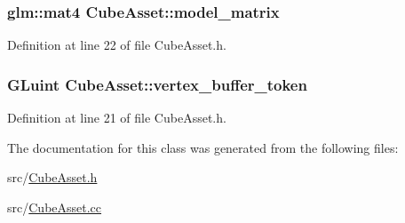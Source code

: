 \subsubsection[{model\+\_\+matrix}]{\setlength{\rightskip}{0pt plus 5cm}glm\+::mat4 Cube\+Asset\+::model\+\_\+matrix\hspace{0.3cm}{\ttfamily [private]}}\label{class_cube_asset_a49b69783f209cc8268a8be7d46c803d6}


Definition at line 22 of file Cube\+Asset.\+h.

\hypertarget{class_cube_asset_a31bd098f60e2c24988316a9cc9335987}{}
\subsubsection[{vertex\+\_\+buffer\+\_\+token}]{\setlength{\rightskip}{0pt plus 5cm}G\+Luint Cube\+Asset\+::vertex\+\_\+buffer\+\_\+token\hspace{0.3cm}{\ttfamily [private]}}\label{class_cube_asset_a31bd098f60e2c24988316a9cc9335987}


Definition at line 21 of file Cube\+Asset.\+h.



The documentation for this class was generated from the following files\+:\begin{DoxyCompactItemize}
\item 
src/\hyperlink{_cube_asset_8h}{Cube\+Asset.\+h}\item 
src/\hyperlink{_cube_asset_8cc}{Cube\+Asset.\+cc}\end{DoxyCompactItemize}
